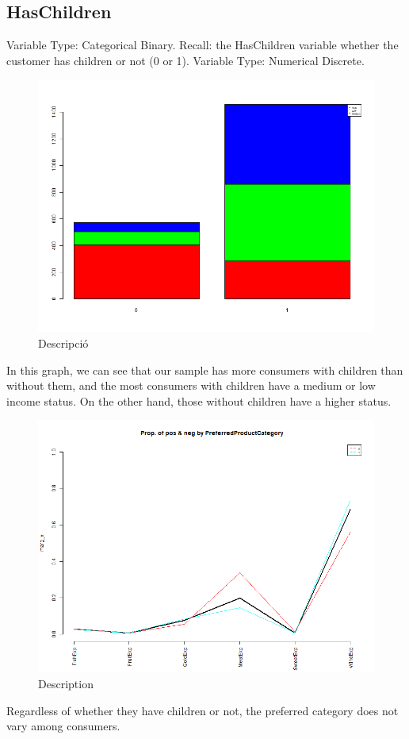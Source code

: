 \subsection{HasChildren}
Variable Type: Categorical Binary.\newline
Recall: the HasChildren variable  whether the customer has children or not (0 or 1).
Variable Type: Numerical Discrete.\newline

\begin{figure}[H]
    \centering
    \includegraphics[width=0.8\linewidth]{Imatges/stacked_barplot_counts_IncomeSegment_10_legend.png}
    \caption{Descripció}
    \label{fig:scree_plot}
\end{figure}
\newline
In this graph, we can see that our sample has more consumers with children than without them, and the most consumers with children have a medium or low income status. On the other hand, those without children have a higher status.
\begin{figure}[H]
    \centering
    \includegraphics[width=0.8\linewidth]{Imatges/prop_cond_class_var_x_PreferredProductCategory_6_legend.png}
    \caption{Description }
    \label{fig:scree_plot}
\end{figure}
\newline
Regardless of whether they have children or not, the preferred category does not vary among consumers.


